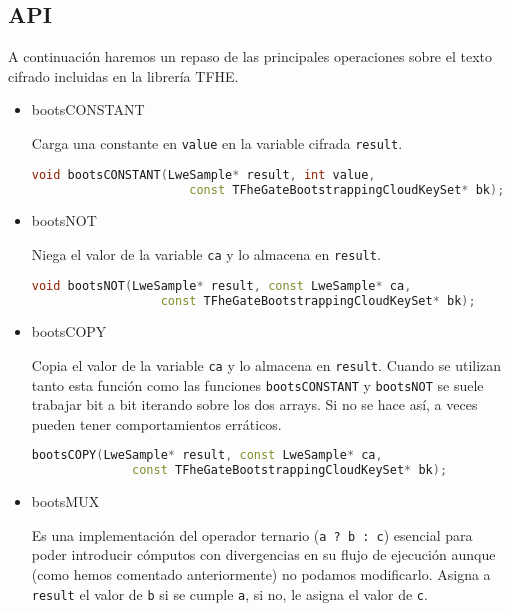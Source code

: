 \subsection{API}

A continuación haremos un repaso de las principales operaciones sobre el texto cifrado incluidas en la librería TFHE.

\begin{itemize}

  \item bootsCONSTANT

  Carga una constante en \verb|value| en la variable cifrada \verb|result|.

  \begin{lstlisting}[language=c++]
    void bootsCONSTANT(LweSample* result, int value,
                      const TFheGateBootstrappingCloudKeySet* bk);
  \end{lstlisting}

  \item bootsNOT

  Niega el valor de la variable \verb|ca| y lo almacena en \verb|result|.

  \begin{lstlisting}[language=c++]
    void bootsNOT(LweSample* result, const LweSample* ca,
                  const TFheGateBootstrappingCloudKeySet* bk);
  \end{lstlisting}

  \item bootsCOPY

  Copia el valor de la variable \verb|ca| y lo almacena en \verb|result|. Cuando se utilizan tanto esta función como las funciones \verb|bootsCONSTANT|  y \verb|bootsNOT| se suele trabajar bit a bit iterando sobre los dos arrays. Si no se hace así, a veces pueden tener comportamientos erráticos.

  \begin{lstlisting}[language=c++]
    bootsCOPY(LweSample* result, const LweSample* ca,
              const TFheGateBootstrappingCloudKeySet* bk);
  \end{lstlisting}

  \item bootsMUX

  Es una implementación del operador ternario (\verb|a ? b : c|) esencial para poder introducir cómputos con divergencias en su flujo de ejecución aunque (como hemos comentado anteriormente) no podamos modificarlo. Asigna a \verb|result| el valor de \verb|b| si se cumple \verb|a|, si no, le asigna el valor de \verb|c|.


\end{itemize}
